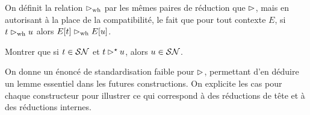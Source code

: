 \begin{definition}
  On définit la relation $\WHred$ par les mêmes paires de réduction que
  $\rhd$, mais en autorisant à la place de la compatibilité, le fait que
  pour tout contexte $E$, si $t \mathrel{\rhd_{\mathrm{wh}}} u$ alors $E[t]\mathrel{\rhd_{\mathrm{wh}}} E[u]$.
  \index[notation]{$\WHred$}
\end{definition}

\begin{exercise}
  Montrer que si $t \in \mathcal{SN}$ et $t \rhd^{\mathord{\star}} u$, alors $u \in \mathcal{SN}$.
\end{exercise}

On donne un énoncé de standardisation faible pour $\rhd$, permettant d'en
déduire un lemme essentiel dans les futures constructions. On explicite les
cas pour chaque constructeur pour illustrer ce qui correspond à des réductions
de tête et à des réductions internes.

